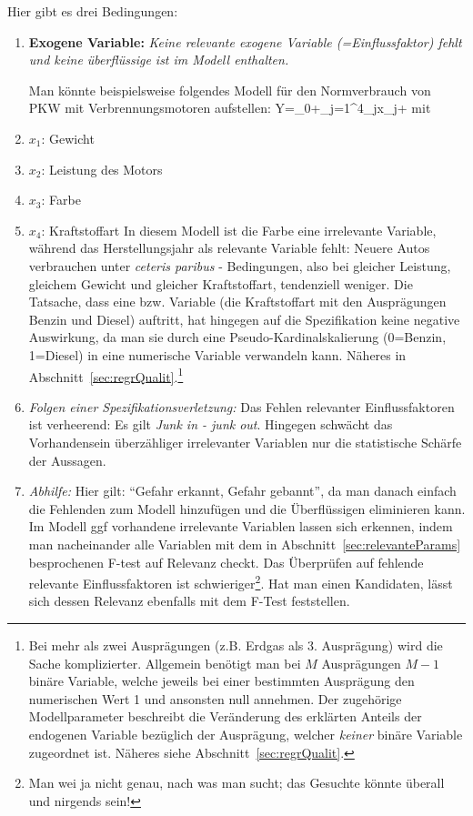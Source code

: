 Hier gibt es drei Bedingungen:
\begin{enumerate}
\item \textbf{Exogene Variable:} \emph{Keine relevante exogene
Variable (=Einflussfaktor)
 fehlt und keine \"uberfl\"ussige ist im Modell enthalten.}

Man k\"onnte beispielsweise folgendes Modell f\"ur den Normverbrauch
von PKW mit Verbrennungsmotoren aufstellen:
\bdm
Y=\beta_0+\sum_{j=1}^4\beta_jx_j+\epsilon
\edm
mit 
\bi
\item $x_1$: Gewicht
\item $x_2$: Leistung des Motors
\item $x_3$: Farbe
\item $x_4$: Kraftstoffart
\ei
In diesem Modell ist die Farbe eine irrelevante Variable, w\"ahrend
das Herstellungsjahr als relevante Variable fehlt: Neuere  Autos
verbrauchen unter \emph{ceteris paribus} - Bedingungen, also bei
gleicher Leistung, gleichem Gewicht und gleicher Kraftstoffart,  tendenziell 
weniger. Die Tatsache, dass eine  bzw. 
 Variable (die
Kraftstoffart mit den Auspr\"agungen Benzin und Diesel)
auftritt, hat hingegen auf die Spezifikation keine negative
Auswirkung, da man sie durch eine Pseudo-Kardinalskalierung (0=Benzin,
1=Diesel) in eine numerische Variable verwandeln kann. N\"aheres in
Abschnitt~\ref{sec:regrQualit}.\footnote{Bei
mehr als zwei Auspr\"agungen (z.B. Erdgas als 3. Auspr\"agung) wird
die Sache komplizierter. Allgemein ben\"otigt man bei $M$
Auspr\"agungen $M-1$ bin\"are Variable, welche jeweils bei einer
bestimmten Auspr\"agung den numerischen Wert 1 und ansonsten null
annehmen. Der zugeh\"orige Modellparameter beschreibt die Ver\"anderung des
erkl\"arten Anteils der endogenen Variable bez\"uglich der
Auspr\"agung, welcher \emph{keiner} bin\"are Variable zugeordnet
ist. N\"aheres siehe Abschnitt~\ref{sec:regrQualit}.}

\bi
\item \textit{Folgen einer Spezifikationsverletzung:}
Das Fehlen relevanter Einflussfaktoren ist verheerend: Es gilt
\emph{Junk in - junk out}. Hingegen schw\"acht  das Vorhandensein
\"uberz\"ahliger irrelevanter Variablen nur die statistische 
Sch\"arfe der Aussagen.

\item \textit{Abhilfe:} Hier gilt: ``Gefahr erkannt, Gefahr
gebannt'', da man danach einfach die Fehlenden zum Modell hinzuf\"ugen und die
\"Uberfl\"ussigen eliminieren kann. Im Modell ggf vorhandene 
irrelevante Variablen lassen sich erkennen, indem man nacheinander alle Variablen
mit dem in Abschnitt~\ref{sec:relevanteParams} besprochenen F-test auf
Relevanz checkt. 
Das \"Uberpr\"ufen auf  fehlende relevante Einflussfaktoren ist
schwieriger\footnote{Man wei\3 ja nicht genau, nach was man sucht; das
Gesuchte k\"onnte \"uberall und nirgends sein!}. Hat man einen
Kandidaten, l\"asst sich dessen Relevanz ebenfalls mit dem F-Test
feststellen. 
\ei


\end{enumerate}
